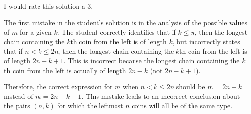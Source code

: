 I would rate this solution a 3.

The first mistake in the student's solution is in the analysis of the possible values of \( m \) for a given \( k \). The student correctly identifies that if \( k \leq n \), then the longest chain containing the \( k \)th coin from the left is of length \( k \), but incorrectly states that if \( n < k \leq 2n \), then the longest chain containing the \( k \)th coin from the left is of length \( 2n - k + 1 \). This is incorrect because the longest chain containing the \( k \)th coin from the left is actually of length \( 2n - k \) (not \( 2n - k + 1 \)). 

Therefore, the correct expression for \( m \) when \( n < k \leq 2n \) should be \( m = 2n - k \) instead of \( m = 2n - k + 1 \). This mistake leads to an incorrect conclusion about the pairs \( (n, k) \) for which the leftmost \( n \) coins will all be of the same type.
